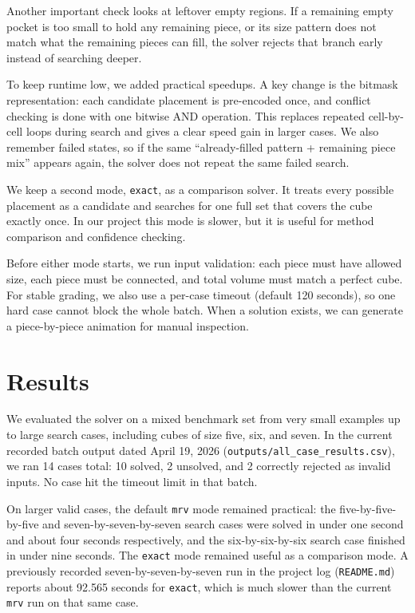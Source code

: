 \documentclass[11pt]{article}
\begin{document}
Another important check looks at leftover empty regions. If a remaining empty pocket is too small to hold any remaining piece, or its size pattern does not match what the remaining pieces can fill, the solver rejects that branch early instead of searching deeper.

To keep runtime low, we added practical speedups. A key change is the bitmask representation: each candidate placement is pre-encoded once, and conflict checking is done with one bitwise AND operation. This replaces repeated cell-by-cell loops during search and gives a clear speed gain in larger cases. We also remember failed states, so if the same ``already-filled pattern + remaining piece mix'' appears again, the solver does not repeat the same failed search.

We keep a second mode, \texttt{exact}, as a comparison solver. It treats every possible placement as a candidate and searches for one full set that covers the cube exactly once. In our project this mode is slower, but it is useful for method comparison and confidence checking.

Before either mode starts, we run input validation: each piece must have allowed size, each piece must be connected, and total volume must match a perfect cube. For stable grading, we also use a per-case timeout (default 120 seconds), so one hard case cannot block the whole batch. When a solution exists, we can generate a piece-by-piece animation for manual inspection.

\section*{Results}
We evaluated the solver on a mixed benchmark set from very small examples up to large search cases, including cubes of size five, six, and seven. In the current recorded batch output dated April 19, 2026 (\texttt{outputs/all\_case\_results.csv}), we ran 14 cases total: 10 solved, 2 unsolved, and 2 correctly rejected as invalid inputs. No case hit the timeout limit in that batch.

On larger valid cases, the default \texttt{mrv} mode remained practical: the five-by-five-by-five and seven-by-seven-by-seven search cases were solved in under one second and about four seconds respectively, and the six-by-six-by-six search case finished in under nine seconds. The \texttt{exact} mode remained useful as a comparison mode. A previously recorded seven-by-seven-by-seven run in the project log (\texttt{README.md}) reports about 92.565 seconds for \texttt{exact}, which is much slower than the current \texttt{mrv} run on that same case.
\end{document}
